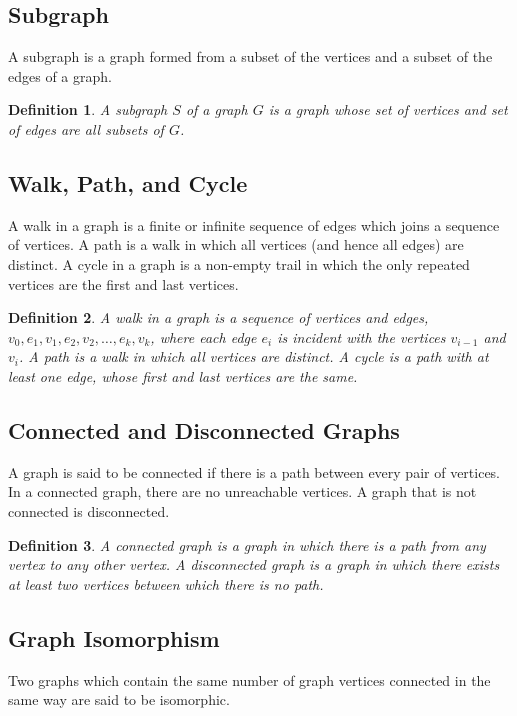 \documentclass{article}
\newtheorem{definition}{Definition}
\begin{document}
\subsection{Subgraph}
A subgraph is a graph formed from a subset of the vertices and a subset of the edges of a graph.

\begin{definition}
	A \textit{subgraph} \(S\) of a graph \(G\) is a graph whose set of vertices and set of edges are all subsets of \(G\).
\end{definition}

\subsection{Walk, Path, and Cycle}
A walk in a graph is a finite or infinite sequence of edges which joins a sequence of vertices. A path is a walk in which all vertices (and hence all edges) are distinct. A cycle in a graph is a non-empty trail in which the only repeated vertices are the first and last vertices.

\begin{definition}
	A \textit{walk} in a graph is a sequence of vertices and edges, \(v_0, e_1, v_1, e_2, v_2, \ldots, e_k, v_k\), where each edge \(e_i\) is incident with the vertices \(v_{i-1}\) and \(v_i\). A \textit{path} is a walk in which all vertices are distinct. A \textit{cycle} is a path with at least one edge, whose first and last vertices are the same.
\end{definition}

\subsection{Connected and Disconnected Graphs}
A graph is said to be connected if there is a path between every pair of vertices. In a connected graph, there are no unreachable vertices. A graph that is not connected is disconnected.

\begin{definition}
	A \textit{connected graph} is a graph in which there is a path from any vertex to any other vertex. A \textit{disconnected graph} is a graph in which there exists at least two vertices between which there is no path.
\end{definition}


\subsection{Graph Isomorphism}
Two graphs which contain the same number of graph vertices connected in the same way are said to be isomorphic.
\end{document}
